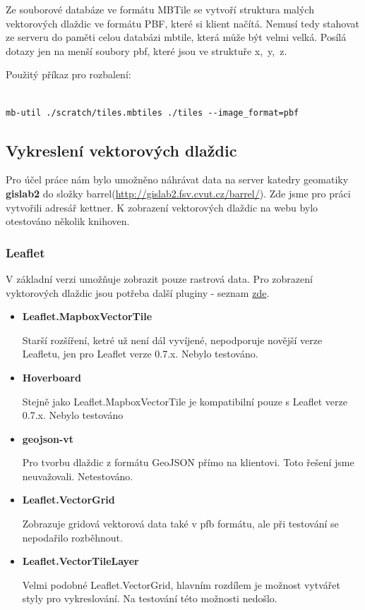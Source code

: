 \documentclass[12pt]{article}
\begin{document}
Ze souborové databáze ve formátu MBTile se vytvoří struktura malých vektorových dlaždic ve formátu PBF, které si klient načítá. Nemusí tedy stahovat ze serveru do paměti celou databázi mbtile, která může být velmi velká. Posílá dotazy jen na menší soubory pbf, které jsou ve struktuře \mbox{x, y, z}.

Použitý příkaz pro rozbalení:

\begin{lstlisting}

mb-util ./scratch/tiles.mbtiles ./tiles --image_format=pbf

\end{lstlisting}

\subsection{Vykreslení vektorových dlaždic}
Pro účel práce nám bylo umožněno náhrávat data na server katedry geomatiky \textbf{gislab2} do složky barrel(\url{http://gislab2.fsv.cvut.cz/barrel/}). Zde jsme pro práci vytvořili adresář kettner. K zobrazení vektorových dlaždic na webu bylo otestováno několik knihoven.

\subsubsection{Leaflet}
V základní verzi umožňuje zobrazit pouze rastrová data. Pro zobrazení vyktorových dlaždic jsou potřeba další pluginy - seznam \href{https://leafletjs.com/plugins.html#vector-tiles}{zde}.

\begin{itemize}
	\item \textbf{Leaflet.MapboxVectorTile}
	
	Starší rozšíření, ketré už není dál vyvíjené, nepodporuje novější verze Leafletu, jen pro Leaflet verze 0.7.x. Nebylo testováno.
	
	\item \textbf{Hoverboard}
	
	Stejně jako Leaflet.MapboxVectorTile je kompatibilní pouze s Leaflet verze 0.7.x. Nebylo testováno
	
	\item \textbf{geojson-vt}
	
	Pro tvorbu dlaždic z formátu GeoJSON přímo na klientovi. Toto řešení jsme neuvažovali. Netestováno.
	
	\item \textbf{Leaflet.VectorGrid}
	
	Zobrazuje gridová vektorová data také v pfb formátu, ale při testování se nepodařilo rozběhnout.
	
	\item \textbf{Leaflet.VectorTileLayer}
	
	Velmi podobné Leaflet.VectorGrid, hlavním rozdílem je možnost vytvářet styly pro vykreslování. Na testování této možnosti nedošlo.
	
\end{itemize}
\end{document}
